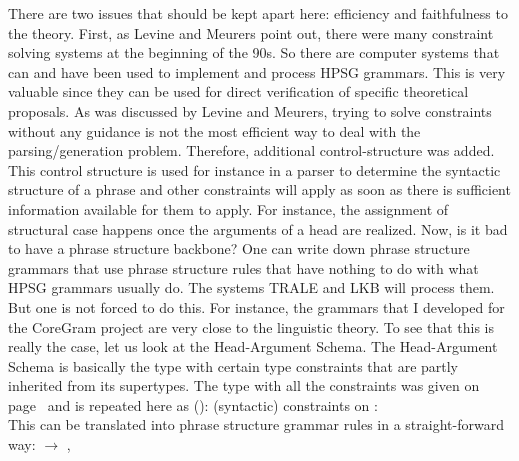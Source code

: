\largerpage
There are two issues that should be kept apart here: efficiency and faithfulness to the
theory. First, as Levine and Meurers point out, there were many constraint solving systems at the
beginning of the 90s. So there are computer systems that can and have been used to implement
and process HPSG grammars. This is very valuable since they can be used for direct verification of
specific theoretical proposals. As was discussed by Levine and Meurers, trying to solve constraints
without any guidance is not the most efficient way to deal with the parsing/generation
problem. Therefore, additional control-structure was added. This control structure is used for
instance in a parser to determine the syntactic structure of a phrase and other constraints will
apply as soon as there is sufficient information available for them to apply. For instance, the
assignment of structural case happens once the arguments of a head are realized. Now, is it bad to
have a phrase structure backbone? One can write down phrase structure grammars that use phrase
structure rules that have nothing to do with what HPSG grammars usually do. The systems TRALE \citep*{MPR2002a-u,Penn2004a-u} and
LKB will process them. But one is not forced to do this. For instance, the grammars that I developed
for the CoreGram project \citep{MuellerCoreGramBrief,MuellerCoreGram} are very close to the linguistic theory. To see that this is really the
case, let us look at the Head-Argument Schema. The Head-Argument Schema is basically the type
 with certain type constraints that are partly inherited from its
supertypes. The type with all the constraints was given on page~\pageref{head-arg-schema-hfp} and is
repeated here as ():
\eas
\label{head-arg-schema-hfp-zwei}
(syntactic) constraints on :\\
\zs
This can be translated into phrase structure grammar rules in a straight-forward way:
\eal
\ex {} $\to$ , 
